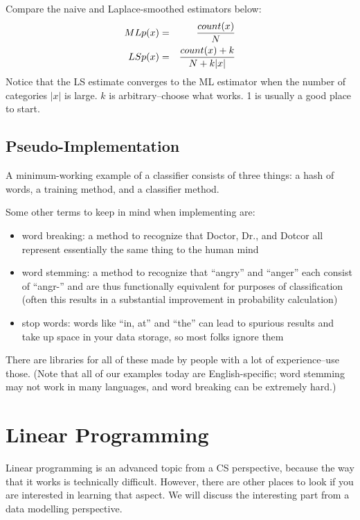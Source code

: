 \documentclass[12pt,letter]{article}
\begin{document}
Compare the naive and Laplace-smoothed estimators below:
\begin{eqnarray*}
ML p(x) &=& {count(x) \over N} \\
LS p(x) &=& {count(x) + k \over N + k|x|}
\end{eqnarray*}
Notice that the LS estimate converges to the ML estimator when the
number of categories $|x|$ is large. $k$ is arbitrary--choose what
works. 1 is usually a good place to start.


\subsection{Pseudo-Implementation}

A minimum-working example of a classifier consists of three things: a
hash of words, a training method, and a classifier method.

Some other terms to keep in mind when implementing are:
\begin{itemize}
\item word breaking: a method to recognize that Doctor, Dr., and Dotcor all
represent essentially the same thing to the human mind
\item word stemming: a method to recognize that ``angry'' and
  ``anger'' each consist of ``angr-'' and are thus functionally
  equivalent for purposes of classification (often this results in a
  substantial improvement in probability calculation)
\item stop words: words like ``in, at'' and ``the'' can lead to
  spurious results and take up space in your data storage, so most
  folks ignore them
\end{itemize}

There are libraries for all of these made by people with a lot of
experience--use those. (Note that all of our examples today are
English-specific; word stemming may not work in many languages, and
word breaking can be extremely hard.) 


\section{Linear Programming}

Linear programming is an advanced topic from a CS perspective, because
the way that it works is technically difficult. However, there are
other places to look if you are interested in learning that aspect. We
will discuss the interesting part from a data modelling perspective. 
\end{document}
